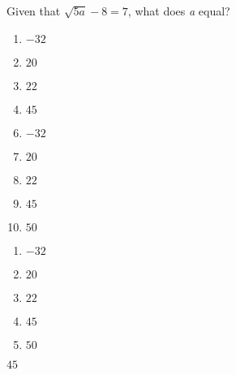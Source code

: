 Given that $\sqrt{5\textit{a}}-8=7$, what does \textit{a} equal?

\ifsat
	\begin{enumerate}[label=\Alph*)]
		\item   $-32$
		\item  $20$ 
		\item  $22$ 
		\item  $45$ %
	\end{enumerate}
\else
\fi

\ifacteven
	\begin{enumerate}[label=\textbf{\Alph*.},itemsep=\fill,align=left]
		\setcounter{enumii}{5}
		\item   $-32$
		\item  $20$ 
		\item  $22$ 
		\addtocounter{enumii}{1}
		\item  $45$ %
		\item  $50$
	\end{enumerate}
\else
\fi

\ifactodd
	\begin{enumerate}[label=\textbf{\Alph*.},itemsep=\fill,align=left]
		\item   $-32$
		\item  $20$ 
		\item  $22$ 
		\item  $45$ %
		\item  $50$ 
	\end{enumerate}
\else
\fi

\ifgridin
  $45$ %

\else
\fi

